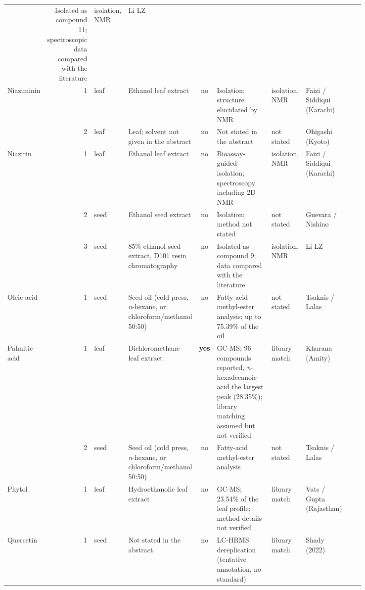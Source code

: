 \begin{landscape}
\begin{longtable}{@{}L{0.11\linewidth} r l L{0.18\linewidth} c L{0.23\linewidth}
    L{0.075\linewidth} L{0.11\linewidth} L{0.13\linewidth}@{}}
    & Isolated as compound 11; spectroscopic data compared with the literature
    & isolation, NMR & Li LZ &  \\
  \addlinespace
  Niaziminin & 1 & leaf & Ethanol leaf extract & no & Isolation; structure elucidated by NMR
    & isolation, NMR & Faizi / Siddiqui (Karachi) &  \\
   & 2 & leaf & Leaf; solvent not given in the abstract & no & Not stated in the abstract
    & not stated & Ohigashi (Kyoto) &  \\
  \addlinespace
  Niazirin & 1 & leaf & Ethanol leaf extract & no & Bioassay-guided isolation; spectroscopy
      including 2D NMR & isolation, NMR & Faizi / Siddiqui (Karachi)
    &  \\
   & 2 & seed & Ethanol seed extract & no & Isolation; method not stated & not stated
    & Guevara / Nishino &  \\
   & 3 & seed & 85\% ethanol seed extract, D101 resin chromatography & no
    & Isolated as compound 9; data compared with the literature & isolation, NMR & Li LZ
    &  \\
  \addlinespace
  Oleic acid & 1 & seed & Seed oil (cold press, \textit{n}-hexane, or chloroform/methanol
      50:50) & no & Fatty-acid methyl-ester analysis; up to 75.39\% of the oil & not stated
    & Tsaknis / Lalas &  \\
  \addlinespace
  Palmitic acid & 1 & leaf & Dichloromethane leaf extract & \textbf{yes} & GC-MS; 96
      compounds reported, \textit{n}-hexadecanoic acid the largest peak (28.35\%); library
      matching assumed but not verified & library match & Khurana (Amity)
    &  \\
   & 2 & seed & Seed oil (cold press, \textit{n}-hexane, or chloroform/methanol 50:50) & no
    & Fatty-acid methyl-ester analysis & not stated & Tsaknis / Lalas
    &  \\
  \addlinespace
  Phytol & 1 & leaf & Hydroethanolic leaf extract & no & GC-MS; 23.54\% of the leaf profile;
      method details not verified & library match & Vats / Gupta (Rajasthan)
    &  \\
  \addlinespace
  Quercetin & 1 & seed & Not stated in the abstract & no & LC-HRMS dereplication (tentative
      annotation, no standard) & library match & Shady (2022)

\end{longtable}
\end{landscape}
